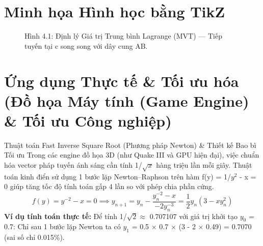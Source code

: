 \documentclass[11pt,a4paper,oneside]{book}
\begin{document}
\section{Minh họa Hình học bằng TikZ}
\begin{figure}[htbp]
\centering
{}
\caption{Hình 4.1: Định lý Giá trị Trung bình Lagrange (MVT) — Tiếp tuyến tại c song song với dây cung AB.}
\label{fig:tikz-ch4-mvt}
\end{figure}

\section{Ứng dụng Thực tế \& Tối ưu hóa (Đồ họa Máy tính (Game Engine) \& Tối ưu Công nghiệp)}
\begin{ungdung}{Thuật toán Fast Inverse Square Root (Phương pháp Newton) \& Thiết kế Bao bì Tối ưu}
Trong các engine đồ họa 3D (như Quake III và GPU hiện đại), việc chuẩn hóa vector pháp tuyến ánh sáng cần tính 1/$\sqrt{x}$ hàng triệu lần mỗi giây. Thuật toán kinh điển sử dụng 1 bước lặp Newton–Raphson trên hàm f(y) = 1/$y^2$ - x = 0 giúp tăng tốc độ tính toán gấp 4 lần so với phép chia phần cứng.
\[ f(y) = y^{-2} - x = 0 \implies y_{n+1} = y_n - \frac{y_n^{-2} - x}{-2y_n^{-3}} = \frac{1}{2}y_n(3 - x y_n^2) \]
\noindent\textbf{Ví dụ tính toán thực tế:} Để tính 1/$\sqrt{2} \approx$  0.707107 với giá trị khởi tạo $y_0$ = 0.7: Chỉ sau 1 bước lặp Newton ta có $y_1$ = 0.5 $\times$  0.7 $\times$  (3 - 2 $\times$  0.49) = 0.7070 (sai số chỉ 0.015\%).
\end{ungdung}
\end{document}
